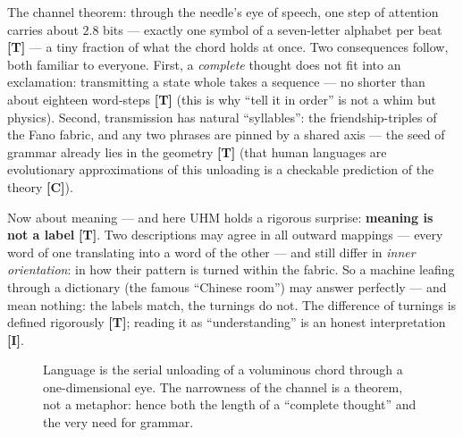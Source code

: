 \documentclass[11pt,letterpaper]{article}
\newcommand{\stT}{\textbf{[T]}\xspace}
\newcommand{\stC}{\textbf{[C]}\xspace}
\newcommand{\stI}{\textbf{[I]}\xspace}
\begin{document}
The channel theorem: through the needle's eye of speech, one step of
attention carries about $2.8$ bits --- exactly one symbol of a
seven-letter alphabet per beat \stT{} --- a tiny fraction of what
the chord holds at once. Two consequences follow, both familiar to
everyone. First, a \emph{complete} thought does not fit into an
exclamation: transmitting a state whole takes a sequence --- no
shorter than about eighteen word-steps \stT{} (this is why ``tell it
in order'' is not a whim but physics). Second, transmission has
natural ``syllables'': the friendship-triples of the Fano fabric,
and any two phrases are pinned by a shared axis --- the seed of
grammar already lies in the geometry \stT{} (that human languages
are evolutionary approximations of this unloading is a checkable
prediction of the theory \stC).

Now about meaning --- and here UHM holds a rigorous surprise:
\textbf{meaning is not a label} \stT. Two descriptions may agree in
all outward mappings --- every word of one translating into a word
of the other --- and still differ in \emph{inner orientation}: in
how their pattern is turned within the fabric. So a machine leafing
through a dictionary (the famous ``Chinese room'') may answer
perfectly --- and mean nothing: the labels match, the turnings do
not. The difference of turnings is defined rigorously \stT; reading
it as ``understanding'' is an honest interpretation \stI.

\begin{figure}[H]
\centering
{}
\caption{Language is the serial unloading of a voluminous chord
through a one-dimensional eye. The narrowness of the channel is a
theorem, not a metaphor: hence both the length of a ``complete
thought'' and the very need for grammar.}
\label{fig:needle}
\end{figure}
\end{document}
